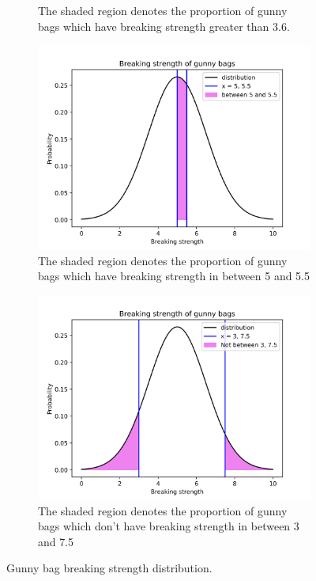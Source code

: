 \documentclass[12pt,a4paper]{style}
\begin{document}
\begin{figure}[h]
\begin{subfigure}[t]{0.45\textwidth}
			\caption{The shaded region denotes the proportion of gunny bags which have breaking strength greater than 3.6.}
			\label{fig:2.2}
		\end{subfigure}
		\hfill
	\begin{subfigure}[t]{0.45\textwidth}
		\includegraphics[width=\textwidth]{2_3.png}
		\caption{The shaded region denotes the proportion of gunny bags which have breaking strength in between 5 and 5.5 }
		\label{fig:2.3}
	\end{subfigure}
	\hfill
	\begin{subfigure}[t]{0.45\textwidth}
		\includegraphics[width=\textwidth]{2_4.png}
		\caption{The shaded region denotes the proportion of gunny bags which don't have breaking strength in between 3 and 7.5}
		\label{fig:2.4}
	\end{subfigure}
	\caption{Gunny bag breaking strength distribution. }
	\label{fig : 1}
	\end{figure}	
\end{document}
